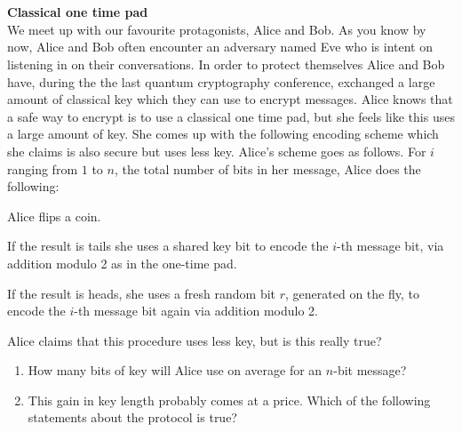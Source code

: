 

\chapter{}

\begin{exercises}

\item {\bf Classical one time pad}\\
We meet up with our favourite protagonists, Alice and Bob. As you know by now, Alice and Bob often encounter an adversary named Eve who is intent on listening in on their conversations. In order to protect themselves Alice and Bob have, during the the last quantum cryptography conference, exchanged a large amount of classical key which they can use to encrypt messages. Alice knows that a safe way to encrypt is to use a classical one time pad, but she feels like this uses a large amount of key. She comes up with the following encoding scheme which she claims is also secure but uses less key. Alice's scheme goes as follows. For $i$ ranging from $1$ to $n$, the total number of bits in her message, Alice does the following: 
\begin{protocolEnumerate}
\item Alice flips a coin.
\item If the result is tails she uses a shared key bit to encode the $i$-th message bit, via addition modulo 2 as in the one-time pad.
\item If the result is heads,  she uses a fresh random bit $r$, generated on the fly, to encode the $i$-th message bit again via addition modulo 2. 
\end{protocolEnumerate}
Alice claims that this procedure uses less key, but is this really true?
\begin{enumerate}
\item  How many bits of key will Alice use on average for an $n$-bit message? 
\item This gain in key length probably comes at a price. Which of the following statements about the protocol is true?
\end{enumerate}
\end{exercises}
